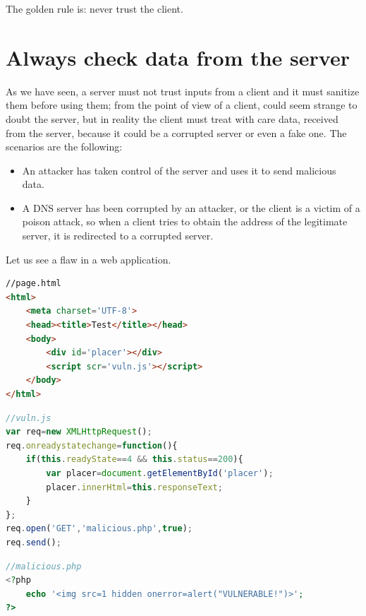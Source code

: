 The golden rule is: never trust the client.

\section{Always check data from the server}
As we have seen, a server must not trust inputs from a client and it must sanitize them before using them; from the point of view of a client, could seem strange to doubt the server, but in reality the client must treat with care data, received from the server, because it could be a corrupted server or even a fake one.\newline
The scenarios are the following:
\begin{itemize}
	\item An attacker has taken control of the server and uses it to send malicious data.
	\item A DNS server has been corrupted by an attacker, or the client is a victim of a poison attack, so when a client tries to obtain the address of the legitimate server, it is redirected to
	a corrupted server.
\end{itemize}

Let us see a flaw in a web application.

\begin{lstlisting}[language=html]
//page.html
<html>
	<meta charset='UTF-8'>
	<head><title>Test</title></head>
	<body>
		<div id='placer'></div>
		<script scr='vuln.js'></script>
	</body>
</html>
\end{lstlisting}

\begin{lstlisting}[language=Javascript]
//vuln.js
var req=new XMLHttpRequest();
req.onreadystatechange=function(){
	if(this.readyState==4 && this.status==200){
		var placer=document.getElementById('placer');
		placer.innerHtml=this.responseText;
	}
};
req.open('GET','malicious.php',true);
req.send();
\end{lstlisting}

\begin{lstlisting}[language=php]
//malicious.php
<?php
	echo '<img src=1 hidden onerror=alert("VULNERABLE!")>';
?>
\end{lstlisting}

